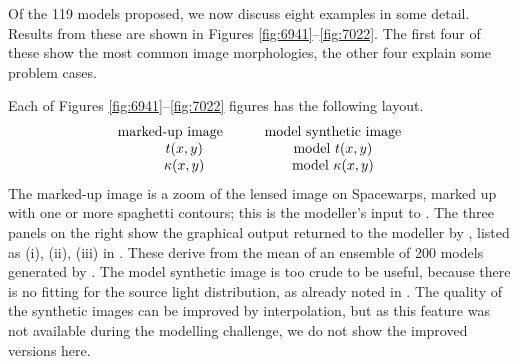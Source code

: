 Of the 119 models proposed, we now discuss eight examples in some
detail.  Results from these are shown in Figures
\ref{fig:6941}--\ref{fig:7022}.  The first four of these show the most
common image morphologies, the other four explain some problem cases.

Each of Figures \ref{fig:6941}--\ref{fig:7022} figures has the
following layout.
$$ \begin{matrix}
\hbox{marked-up image} \qquad &\hbox{model synthetic image} \\
t(x,y)                        &\hbox{model } t(x,y) \\
\kappa(x,y)                   &\hbox{model } \kappa(x,y)
\end{matrix} $$
The marked-up image is a zoom of the lensed image on Spacewarps,
marked up with one or more spaghetti contours; this is the modeller's
input to \spl.  The three panels on the right show the graphical
output returned to the modeller by \spl, listed as (i), (ii), (iii) in
.  These derive from the mean of an ensemble of
200 models generated by \spl. The model synthetic image is too crude
to be useful, because there is no fitting for the source light
distribution, as already noted in .  The quality of the
synthetic images can be improved by interpolation, but as this feature
was not available during the modelling challenge, we do not show the
improved versions here.

\FloatBarrier

